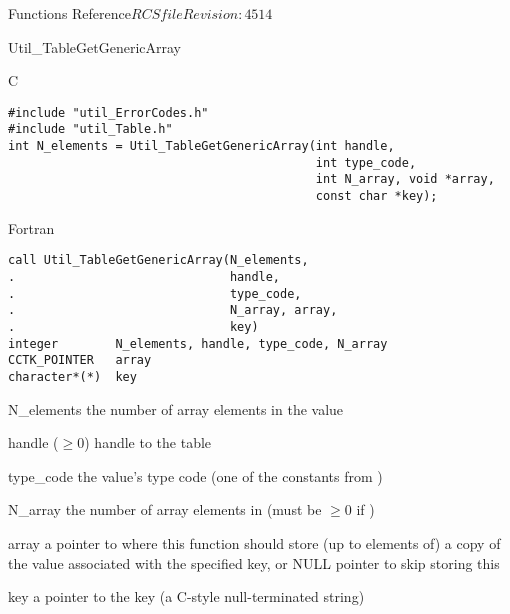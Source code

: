 \begin{cactuspart}{ Functions Reference}{$RCSfile$}{$Revision: 4514 $}
\begin{FunctionDescription}{Util\_TableGetGenericArray}
\begin{SynopsisSection}
\begin{Synopsis}{C}
\begin{verbatim}
#include "util_ErrorCodes.h"
#include "util_Table.h"
int N_elements = Util_TableGetGenericArray(int handle,
                                           int type_code,
                                           int N_array, void *array,
                                           const char *key);
\end{verbatim}
\end{Synopsis}
\begin{Synopsis}{Fortran}
\begin{verbatim}
call Util_TableGetGenericArray(N_elements,
.                              handle,
.                              type_code,
.                              N_array, array,
.                              key)
integer        N_elements, handle, type_code, N_array
CCTK_POINTER   array
character*(*)  key
\end{verbatim}
\end{Synopsis}
\end{SynopsisSection}

\begin{ResultSection}
\begin{Result}{N\_elements}
the number of array elements in the value
\end{Result}
\end{ResultSection}

\begin{ParameterSection}
\begin{Parameter}{handle ($\ge 0$)}
handle to the table
\end{Parameter}
\begin{Parameter}{type\_code}
the value's type code
(one of the  constants from )
\end{Parameter}
\begin{Parameter}{N\_array}
the number of array elements in 
(must be $\ge 0$ if )
\end{Parameter}
\begin{Parameter}{array}
a pointer to where this function should store (up to 
elements of) a copy of the value associated with the specified key,
or NULL pointer to skip storing this
\end{Parameter}
\begin{Parameter}{key}
a pointer to the key (a C-style null-terminated string)
\end{Parameter}
\end{ParameterSection}


\end{FunctionDescription}
\end{cactuspart}
